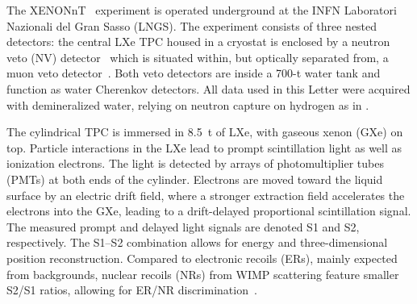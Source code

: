 \documentclass[
    reprint,
    superscriptaddress,
    aps, prl,
    amsmath,amssymb,
    twocolumn,
    showkeys,
    floatfix,
    nofootinbib,
]{revtex4-2}
\begin{document}
The XENONnT~\cite{XENON:2024instr} experiment is operated underground at the INFN Laboratori Nazionali del Gran Sasso (LNGS).
The experiment consists of three nested detectors: the central LXe TPC housed in a cryostat is enclosed by a neutron veto (NV) detector~\cite{XENON:2024neutron_veto} which is situated within, but optically separated from, a muon veto detector~\cite{XENON:2014mveto}.
Both veto detectors are inside a 700-t water tank and function as water Cherenkov detectors.
All data used in this Letter were acquired with demineralized water, relying on neutron capture on hydrogen as in \cite{XENON:2023wimp}. %

The cylindrical TPC is immersed in \SI{8.5}{\tonne} of LXe, with gaseous xenon (GXe) on top.
Particle interactions in the LXe lead to prompt scintillation light as well as ionization electrons.
The light is detected by arrays of photomultiplier tubes (PMTs) at both ends of the cylinder.
Electrons are moved toward the liquid surface by an electric drift field, where a stronger extraction field accelerates the electrons into the GXe, leading to a drift-delayed proportional scintillation signal.
The measured prompt and delayed light signals are denoted S1 and S2, respectively.
The S1--S2 combination allows for energy and three-dimensional position reconstruction.
Compared to electronic recoils (ERs), mainly expected from backgrounds, nuclear recoils (NRs) from WIMP scattering feature smaller S2/S1 ratios, allowing for ER/NR discrimination~\cite{Aprile:2006kx}.
\end{document}
